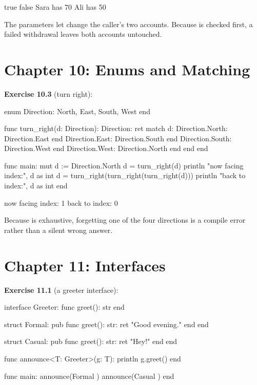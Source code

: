 \begin{progout}
true
false
Sara has 70
Ali has 50
\end{progout}

The \code{\&:} parameters let  change the caller's two accounts.
Because  is checked first, a failed withdrawal leaves both
accounts untouched.

\section*{Chapter 10: Enums and Matching}

\textbf{Exercise 10.3} (turn right):

\begin{salamen}
enum Direction: North, East, South, West end

func turn_right(d: Direction): Direction:
    ret match d:
        Direction.North: Direction.East end
        Direction.East: Direction.South end
        Direction.South: Direction.West end
        Direction.West: Direction.North end
    end
end

func main:
    mut d := Direction.North
    d = turn_right(d)
    println "now facing index:", d as int
    d = turn_right(turn_right(turn_right(d)))
    println "back to index:", d as int
end
\end{salamen}

\begin{progout}
now facing index: 1
back to index: 0
\end{progout}

Because  is exhaustive, forgetting one of the four directions is a
compile error rather than a silent wrong answer.

\section*{Chapter 11: Interfaces}

\textbf{Exercise 11.1} (a greeter interface):

\begin{salamen}
interface Greeter:
    func greet(): str
end

struct Formal:
    pub func greet(): str: ret "Good evening." end
end

struct Casual:
    pub func greet(): str: ret "Hey!" end
end

func announce<T: Greeter>(g: T):
    println g.greet()
end

func main:
    announce(Formal {})
    announce(Casual {})
end
\end{salamen}

